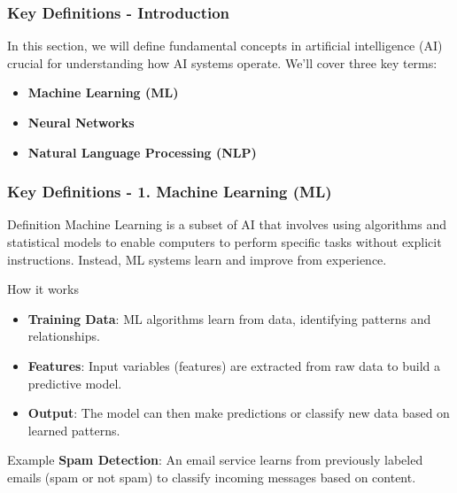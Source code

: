 \documentclass[aspectratio=169]{beamer}
\begin{document}
\begin{frame}[fragile]
    \frametitle{Key Definitions - Introduction}
    In this section, we will define fundamental concepts in artificial intelligence (AI) crucial for understanding how AI systems operate. We'll cover three key terms:
    \begin{itemize}
        \item \textbf{Machine Learning (ML)}
        \item \textbf{Neural Networks}
        \item \textbf{Natural Language Processing (NLP)}
    \end{itemize}
\end{frame}

\begin{frame}[fragile]
    \frametitle{Key Definitions - 1. Machine Learning (ML)}
    \begin{block}{Definition}
        Machine Learning is a subset of AI that involves using algorithms and statistical models to enable computers to perform specific tasks without explicit instructions. Instead, ML systems learn and improve from experience.
    \end{block}

    \begin{block}{How it works}
        \begin{itemize}
            \item \textbf{Training Data}: ML algorithms learn from data, identifying patterns and relationships.
            \item \textbf{Features}: Input variables (features) are extracted from raw data to build a predictive model.
            \item \textbf{Output}: The model can then make predictions or classify new data based on learned patterns.
        \end{itemize}
    \end{block}

    \begin{block}{Example}
        \textbf{Spam Detection}: An email service learns from previously labeled emails (spam or not spam) to classify incoming messages based on content.
    \end{block}
\end{frame}
\end{document}
